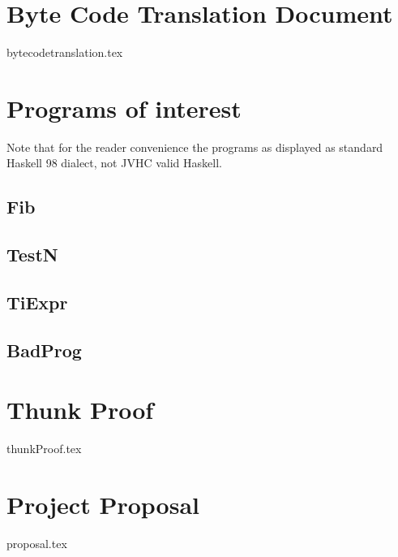 \documentclass[12pt,a4paper,twoside,openright]{book}
\numberwithin{subcase}{case}
\begin{document}
\chapter{Byte Code Translation Document}

\label{appendix:bytecodetranslationdoc}

{bytecodetranslation.tex}

\chapter{Programs of interest}

Note that for the reader convenience the programs as displayed as standard
Haskell 98 dialect, not JVHC valid Haskell.

\section*{Fib}

\section*{TestN}

\section*{TiExpr}

\section*{BadProg}


\label{appendix:programs}

\chapter{Thunk Proof}

{thunkProof.tex}

\label{appendix:thunkProof}

\chapter{Project Proposal}

{proposal.tex}

\label{appendix:proposal}
\end{document}
